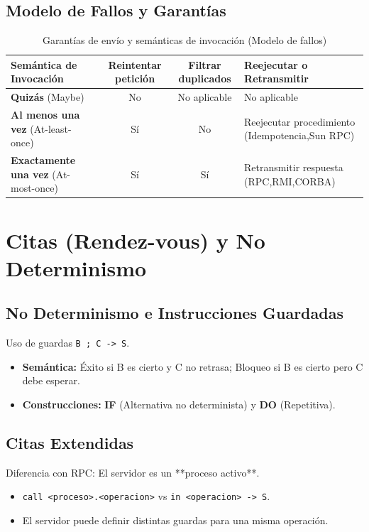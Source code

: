 \subsection{Modelo de Fallos y Garantías}
\begin{table}[h]
\centering
\small %
\caption{Garantías de envío y semánticas de invocación (Modelo de fallos)}
\begin{tabular}{|p{3.5cm}|c|c|p{3.5cm}|} %
\hline
\textbf{Semántica de Invocación} & \textbf{Reintentar petición} & \textbf{Filtrar duplicados} & \textbf{Reejecutar o Retransmitir} \\ \hline
\textbf{Quizás} (Maybe) & No & No aplicable & No aplicable \\ \hline
\textbf{Al menos una vez} (At-least-once) & Sí & No & Reejecutar procedimiento (Idempotencia,Sun RPC) \\ \hline
\textbf{Exactamente una vez} (At-most-once) & Sí & Sí & Retransmitir respuesta (RPC,RMI,CORBA) \\ \hline
\end{tabular}
\end{table}
\section{Citas (Rendez-vous) y No Determinismo}

\subsection{No Determinismo e Instrucciones Guardadas}
Uso de guardas \texttt{B ; C -> S}. 
\begin{itemize}
    \item \textbf{Semántica:} Éxito si B es cierto y C no retrasa; Bloqueo si B es cierto pero C debe esperar.
    \item \textbf{Construcciones:} \textbf{IF} (Alternativa no determinista) y \textbf{DO} (Repetitiva).
\end{itemize}

\subsection{Citas Extendidas}
Diferencia con RPC: El servidor es un **proceso activo**.
\begin{itemize}
    \item \texttt{call <proceso>.<operacion>} vs \texttt{in <operacion> -> S}.
    \item El servidor puede definir distintas guardas para una misma operación.
\end{itemize}

